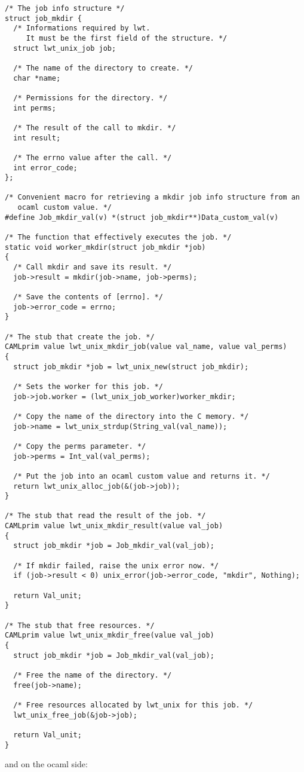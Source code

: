 \lstset{language=c}\begin{lstlisting}/* The job info structure */
struct job_mkdir {
  /* Informations required by lwt.
     It must be the first field of the structure. */
  struct lwt_unix_job job;

  /* The name of the directory to create. */
  char *name;

  /* Permissions for the directory. */
  int perms;

  /* The result of the call to mkdir. */
  int result;

  /* The errno value after the call. */
  int error_code;
};

/* Convenient macro for retrieving a mkdir job info structure from an
   ocaml custom value. */
#define Job_mkdir_val(v) *(struct job_mkdir**)Data_custom_val(v)

/* The function that effectively executes the job. */
static void worker_mkdir(struct job_mkdir *job)
{
  /* Call mkdir and save its result. */
  job->result = mkdir(job->name, job->perms);

  /* Save the contents of [errno]. */
  job->error_code = errno;
}

/* The stub that create the job. */
CAMLprim value lwt_unix_mkdir_job(value val_name, value val_perms)
{
  struct job_mkdir *job = lwt_unix_new(struct job_mkdir);

  /* Sets the worker for this job. */
  job->job.worker = (lwt_unix_job_worker)worker_mkdir;

  /* Copy the name of the directory into the C memory. */
  job->name = lwt_unix_strdup(String_val(val_name));

  /* Copy the perms parameter. */
  job->perms = Int_val(val_perms);

  /* Put the job into an ocaml custom value and returns it. */
  return lwt_unix_alloc_job(&(job->job));
}

/* The stub that read the result of the job. */
CAMLprim value lwt_unix_mkdir_result(value val_job)
{
  struct job_mkdir *job = Job_mkdir_val(val_job);

  /* If mkdir failed, raise the unix error now. */
  if (job->result < 0) unix_error(job->error_code, "mkdir", Nothing);

  return Val_unit;
}

/* The stub that free resources. */
CAMLprim value lwt_unix_mkdir_free(value val_job)
{
  struct job_mkdir *job = Job_mkdir_val(val_job);

  /* Free the name of the directory. */
  free(job->name);

  /* Free resources allocated by lwt_unix for this job. */
  lwt_unix_free_job(&job->job);

  return Val_unit;
}
\end{lstlisting}
and on the ocaml side:



